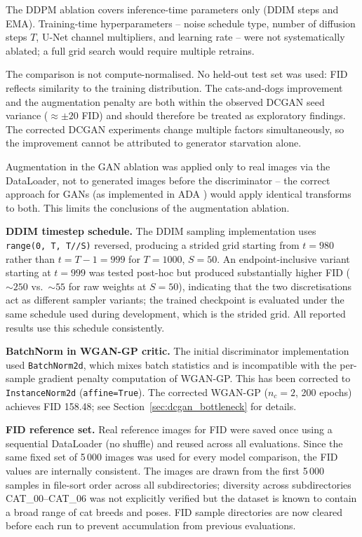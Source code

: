 \documentclass[12pt,a4paper]{article}
\begin{document}
The DDPM ablation covers inference-time parameters only (DDIM steps and EMA).
Training-time hyperparameters -- noise schedule type, number of diffusion steps
$T$, U-Net channel multipliers, and learning rate -- were not systematically
ablated; a full grid search would require multiple retrains.

The comparison is not compute-normalised.  No held-out test set was used: FID
reflects similarity to the training distribution.  The cats-and-dogs improvement
and the augmentation penalty are both within the observed DCGAN seed variance
($\approx \pm 20$ FID) and should therefore be treated as exploratory findings.
The corrected DCGAN experiments change multiple factors simultaneously, so the
improvement cannot be attributed to generator starvation alone.

Augmentation in the GAN ablation was applied only to real images via the
DataLoader, not to generated images before the discriminator -- the correct
approach for GANs (as implemented in ADA \cite{karras2020training}) would apply
identical transforms to both.  This limits the conclusions of the augmentation
ablation.

\textbf{DDIM timestep schedule.}
The DDIM sampling implementation uses \texttt{range(0, T, T//S)} reversed,
producing a strided grid starting from $t=980$ rather than $t=T{-}1=999$ for
$T=1000$, $S=50$.  An endpoint-inclusive variant starting at $t=999$ was tested
post-hoc but produced substantially higher FID (${\sim}250$ vs.\ ${\sim}55$ for
raw weights at $S=50$), indicating that the two discretisations act as different
sampler variants; the trained checkpoint is evaluated under the same schedule
used during development, which is the strided grid.  All reported results use
this schedule consistently.
\label{sec:limitations}

\textbf{BatchNorm in WGAN-GP critic.}
The initial discriminator implementation used \texttt{BatchNorm2d}, which mixes
batch statistics and is incompatible with the per-sample gradient penalty
computation of WGAN-GP.  This has been corrected to \texttt{InstanceNorm2d}
(\texttt{affine=True}).  The corrected WGAN-GP ($n_c{=}2$, 200 epochs) achieves
FID 158.48; see Section~\ref{sec:dcgan_bottleneck} for details.

\textbf{FID reference set.}
Real reference images for FID were saved once using a sequential DataLoader
(no shuffle) and reused across all evaluations.  Since the same fixed set of
5\,000 images was used for every model comparison, the FID values are
internally consistent.  The images are drawn from the first 5\,000 samples
in file-sort order across all subdirectories; diversity across subdirectories
CAT\_00--CAT\_06 was not explicitly verified but the dataset is known to
contain a broad range of cat breeds and poses.  FID sample directories are
now cleared before each run to prevent accumulation from previous evaluations.
\end{document}
